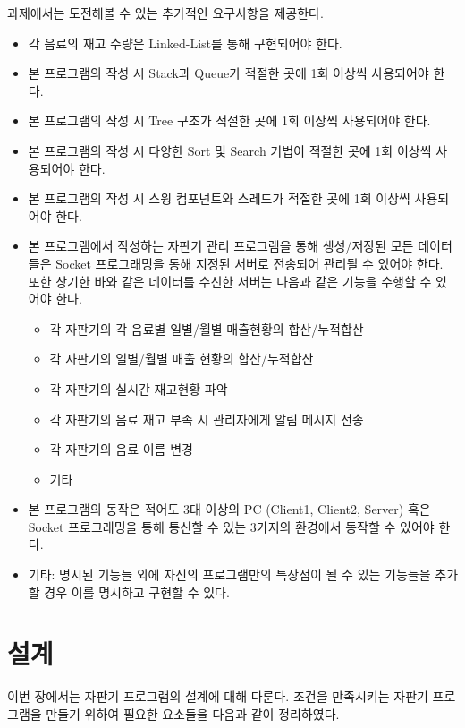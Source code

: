 \documentclass{oblivoir}
\begin{document}
    과제에서는 도전해볼 수 있는 추가적인 요구사항을 제공한다.
    \begin{itemize}
        \item 각 음료의 재고 수량은 Linked-List를 통해 구현되어야 한다.
        \item 본 프로그램의 작성 시 Stack과 Queue가 적절한 곳에
        1회 이상씩 사용되어야 한다.
        \item 본 프로그램의 작성 시 Tree 구조가 적절한 곳에 1회 이상씩
        사용되어야 한다.
        \item 본 프로그램의 작성 시 다양한 Sort 및 Search 기법이
        적절한 곳에 1회 이상씩 사용되어야 한다.
        \item 본 프로그램의 작성 시 스윙 컴포넌트와 스레드가
        적절한 곳에 1회 이상씩 사용되어야 한다.
        \item 본 프로그램에서 작성하는 자판기 관리 프로그램을 통해
        생성/저장된 모든 데이터들은 Socket 프로그래밍을 통해
        지정된 서버로 전송되어 관리될 수 있어야 한다.
        또한 상기한 바와 같은 데이터를 수신한 서버는
        다음과 같은 기능을 수행할 수 있어야 한다.
        \begin{itemize}
            \item 각 자판기의 각 음료별 일별/월별 매출현황의 합산/누적합산
            \item 각 자판기의 일별/월별 매출 현황의 합산/누적합산
            \item 각 자판기의 실시간 재고현황 파악
            \item 각 자판기의 음료 재고 부족 시 관리자에게 알림 메시지 전송
            \item 각 자판기의 음료 이름 변경
            \item 기타
        \end{itemize}
        \item 본 프로그램의 동작은 적어도 3대 이상의 PC
        (Client1, Client2, Server) 혹은 Socket 프로그래밍을 통해
        통신할 수 있는 3가지의 환경에서 동작할 수 있어야 한다.
        \item 기타: 명시된 기능들 외에 자신의 프로그램만의 특장점이 될 수 있는
        기능들을 추가할 경우 이를 명시하고 구현할 수 있다.
    \end{itemize}

    \section{설계}

    이번 장에서는 자판기 프로그램의 설계에 대해 다룬다.
    조건을 만족시키는 자판기 프로그램을 만들기 위하여 필요한 요소들을
    다음과 같이 정리하였다.
\end{document}
